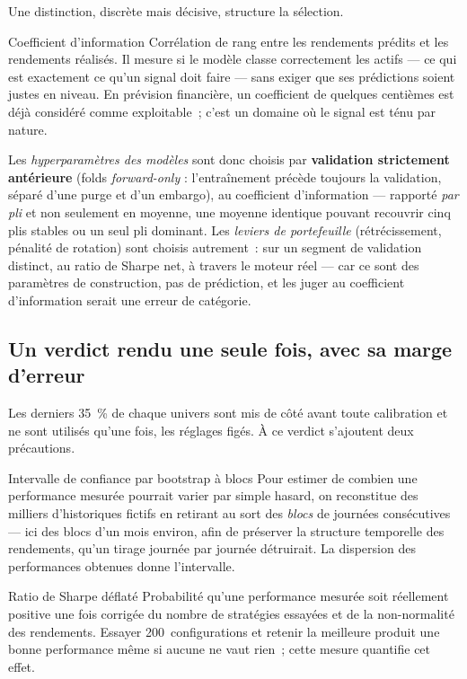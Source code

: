 Une distinction, discrète mais décisive, structure la sélection.

\begin{definitionbox}{Coefficient d'information}
Corrélation de rang entre les rendements prédits et les rendements réalisés. Il
mesure si le modèle classe correctement les actifs — ce qui est exactement ce
qu'un signal doit faire — sans exiger que ses prédictions soient justes en
niveau. En prévision financière, un coefficient de quelques centièmes est déjà
considéré comme exploitable~; c'est un domaine où le signal est ténu par nature.
\end{definitionbox}

Les \emph{hyperparamètres des modèles} sont donc choisis par \textbf{validation
strictement antérieure} (folds \emph{forward-only} : l'entraînement précède
toujours la validation, séparé d'une purge et d'un embargo), au coefficient
d'information — rapporté \emph{par pli} et non seulement en moyenne, une moyenne
identique pouvant recouvrir cinq plis stables ou un seul pli dominant. Les \emph{leviers de portefeuille}
(rétrécissement, pénalité de rotation) sont choisis autrement~: sur un segment de
validation distinct, au ratio de Sharpe net, à travers le moteur réel — car ce
sont des paramètres de construction, pas de prédiction, et les juger au
coefficient d'information serait une erreur de catégorie.

\subsection{Un verdict rendu une seule fois, avec sa marge d'erreur}

Les derniers 35~\% de chaque univers sont mis de côté avant toute calibration et
ne sont utilisés qu'une fois, les réglages figés. À ce verdict s'ajoutent deux
précautions.

\begin{definitionbox}{Intervalle de confiance par bootstrap à blocs}
Pour estimer de combien une performance mesurée pourrait varier par simple
hasard, on reconstitue des milliers d'historiques fictifs en retirant au sort des
\emph{blocs} de journées consécutives — ici des blocs d'un mois environ, afin de
préserver la structure temporelle des rendements, qu'un tirage journée par
journée détruirait. La dispersion des performances obtenues donne l'intervalle.
\end{definitionbox}

\begin{definitionbox}{Ratio de Sharpe déflaté}
Probabilité qu'une performance mesurée soit réellement positive une fois
corrigée du nombre de stratégies essayées et de la non-normalité des rendements.
Essayer 200~configurations et retenir la meilleure produit une bonne performance
même si aucune ne vaut rien~; cette mesure quantifie cet effet.
\end{definitionbox}

